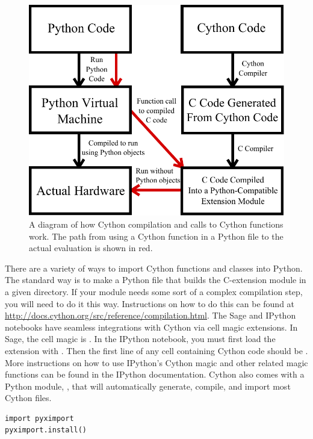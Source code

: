 \begin{figure}
\centering
\includegraphics[width=\textwidth]{compilation.pdf}
\caption{A diagram of how Cython compilation and calls to Cython functions work.
The path from using a Cython function in a Python file to the actual evaluation is shown in red.}
\label{cython:compilation}
\end{figure}

There are a variety of ways to import Cython functions and classes into Python.
The standard way is to make a Python file that builds the C-extension module in a given directory.
If your module needs some sort of a complex compilation step, you will need to do it this way.
Instructions on how to do this can be found at \url{http://docs.cython.org/src/reference/compilation.html}.
The Sage and IPython notebooks have seamless integrations with Cython via cell magic extensions.
In Sage, the cell magic is .
In the IPython notebook, you must first load the extension with .
Then the first line of any cell containing Cython code should be .
More instructions on how to use IPython's Cython magic and other related magic functions can be found in the IPython documentation.
Cython also comes with a Python module, , that will automatically generate, compile, and import most Cython files.
\begin{lstlisting}
import pyximport
pyximport.install()
\end{lstlisting}

